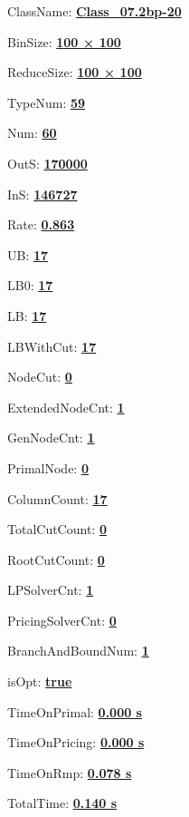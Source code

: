 \documentclass[11pt]{article}
\begin{document}
\pagestyle{empty}


ClassName: \underline{\textbf{Class_07.2bp-20}}
\par
BinSize: \underline{\textbf{100 × 100}}
\par
ReduceSize: \underline{\textbf{100 × 100}}
\par
TypeNum: \underline{\textbf{59}}
\par
Num: \underline{\textbf{60}}
\par
OutS: \underline{\textbf{170000}}
\par
InS: \underline{\textbf{146727}}
\par
Rate: \underline{\textbf{0.863}}
\par
UB: \underline{\textbf{17}}
\par
LB0: \underline{\textbf{17}}
\par
LB: \underline{\textbf{17}}
\par
LBWithCut: \underline{\textbf{17}}
\par
NodeCut: \underline{\textbf{0}}
\par
ExtendedNodeCnt: \underline{\textbf{1}}
\par
GenNodeCnt: \underline{\textbf{1}}
\par
PrimalNode: \underline{\textbf{0}}
\par
ColumnCount: \underline{\textbf{17}}
\par
TotalCutCount: \underline{\textbf{0}}
\par
RootCutCount: \underline{\textbf{0}}
\par
LPSolverCnt: \underline{\textbf{1}}
\par
PricingSolverCnt: \underline{\textbf{0}}
\par
BranchAndBoundNum: \underline{\textbf{1}}
\par
isOpt: \underline{\textbf{true}}
\par
TimeOnPrimal: \underline{\textbf{0.000 s}}
\par
TimeOnPricing: \underline{\textbf{0.000 s}}
\par
TimeOnRmp: \underline{\textbf{0.078 s}}
\par
TotalTime: \underline{\textbf{0.140 s}}
\par
\newpage


\end{document}
